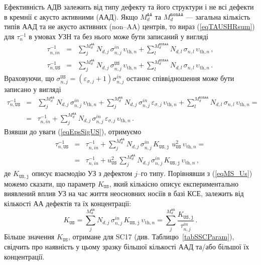 Ефективність АДВ залежить від типу дефекту та його структури \cite{UST:Medvid}
і не всі дефекти в кремнії є акусто активними (ААД).
Якщо $M_d^\mathtt{AA}$ та $M_d^\mathtt{nonAA}$ --- загальна кількість типів ААД та не акусто активних (non--AA) центрів,
то вираз (\ref{eqTAUSHRsum}) для $\tau_{n}^{-1}$ в умовах УЗН та без нього може бути записаний у вигляді
\begin{eqnarray}
\tau_{n,in}^{-1}&=&\sum_j^{M_d^\mathtt{AA}}N_{d,j}\,\sigma_{n,j}^{in}\,\upsilon_{\mathrm{th},n}+
\sum_l^{M_d^\mathtt{nonAA}}N_{d,l}\,\sigma_{n,l}\,\upsilon_{\mathrm{th},n}\,,\\
\tau_{n,\mathtt{US}}^{-1}&=&\sum_j^{M_d^\mathtt{AA}}N_{d,j}\,\sigma_{n,j}^\mathtt{US}\,\upsilon_{\mathrm{th},n}+
\sum_l^{M_d^\mathtt{nonAA}}N_{d,l}\,\sigma_{n,l}\,\upsilon_{\mathrm{th},n}\,.
\end{eqnarray}
Враховуючи, що $\sigma_{n,j}^\mathtt{US}=(\varepsilon_{\sigma,j}+1)\sigma_{n,j}^{in}$ останнє співвідношення може бути записано
у вигляді
\begin{eqnarray}
\label{eqEpsSigUSA}
\tau_{n,\mathtt{US}}^{-1}&=&\sum_j^{M_d^\mathtt{AA}}N_{d,j}\,\sigma_{n,j}^{in}\,\upsilon_{\mathrm{th},n}+
\sum_j^{M_d^\mathtt{AA}}N_{d,j}\,\sigma_{n,j}^{in}\,\varepsilon_{\sigma,j}\,\upsilon_{\mathrm{th},n}+
\sum_l^{M_d^\mathtt{nonAA}}N_{d,l}\,\sigma_{n,l}\,\upsilon_{\mathrm{th},n}=\nonumber\\
&=&\tau_{n,in}^{-1}+\sum_j^{M_d^\mathtt{AA}}N_{d,j}\,\sigma_{n,j}^{in}\,\varepsilon_{\sigma,j}\,\upsilon_{\mathrm{th},n}\,.
\end{eqnarray}
Взявши до уваги (\ref{eqEpsSigUS}), отримуємо
\begin{eqnarray}
\tau_{n,\mathtt{US}}^{-1}&=&\tau_{n,in}^{-1}+
\sum_j^{M_d^\mathtt{AA}}N_{d,j}\,\sigma_{n,j}^{in}\,K_\mathtt{US,j}\,\,u_{\mathtt{US}}^2\,\upsilon_{\mathrm{th},n}=\nonumber\\
&=&\tau_{n,in}^{-1}+u_{\mathtt{US}}^2\,\sum_j^{M_d^\mathtt{AA}}N_{d,j}\,\sigma_{n,j}^{in}\,K_\mathtt{US,j}\,\upsilon_{\mathrm{th},n}\,,
\end{eqnarray}
де $K_\mathtt{US,j}$ описує взаємодію УЗ з дефектом $j$--го типу.
Порівнявши з (\ref{eqMS_Us}) можемо сказати, що параметр $K_\mathtt{US}$, який кількісно описує експериментально виявлений вплив УЗ на час життя неосновних носіїв в базі КСЕ,
залежить від кількості АА дефектів та їх концентрації:
\begin{equation}
\label{eqKUS}
K_\mathtt{US}=\sum_j^{M_d^\mathtt{AA}}N_{d,j}\,\sigma_{n,j}^{in}\,K_\mathtt{US,j}\,\upsilon_{\mathrm{th},n}=\sum_j^{M_d^\mathtt{AA}}\frac{K_\mathtt{US,j}}{\tau_{n,j}^{in}}\,.
\end{equation}
Більше значення $K_\mathtt{US}$, отримане для SC17 (див. Таблицю~\ref{tabSSCParam}), свідчить про наявність у цьому зразку більшої кількості ААД та/або більшої їх концентрації.

